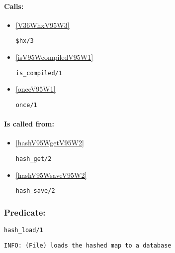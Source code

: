 \paragraph{Calls:} 
\begin{itemize}
\item \ref{V36WhxV95W3} 
\begin{verbatim}
$hx/3
\end{verbatim}

\item \ref{isV95WcompiledV95W1} 
\begin{verbatim}
is_compiled/1
\end{verbatim}

\item \ref{onceV95W1} 
\begin{verbatim}
once/1
\end{verbatim}

\end{itemize}
\paragraph{Is called from:} 
\begin{itemize}
\item \ref{hashV95WgetV95W2} 
\begin{verbatim}
hash_get/2
\end{verbatim}

\item \ref{hashV95WsaveV95W2} 
\begin{verbatim}
hash_save/2
\end{verbatim}

\end{itemize}

\subsubsection{Predicate:} \label{hashV95WloadV95W1}

\begin{verbatim}
hash_load/1
\end{verbatim}

{\small \begin{verbatim}
INFO: (File) loads the hashed map to a database

\end{verbatim}}
